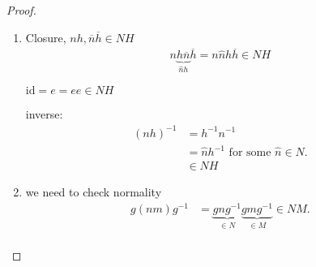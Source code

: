 \begin{proof} ~
  \begin{enumerate} \def\labelenumi{\roman{enumi}.}
  \item
    Closure, $nh, \overline{n} \overline{h} \in NH$
    \begin{align*}
      n \underbrace{h \overline{n}}_{\hat{n} h} \overline{h} = n \hat{n} h \overline{h} \in NH
    \end{align*}

    $\text{id} = e = ee \in NH$

    inverse:
    \begin{align*}
        (nh)^{-1} &= h^{-1} n^{-1} \\
        &= \hat{n} h^{-1} \text{ for some } \hat{n} \in N. \\
        &\in NH
    \end{align*}
  \item
    we need to check normality
    \begin{align*}
      g (nm) g^{-1} &= \underbrace{g n g^{-1}}_{\in N} \underbrace{g m g^{-1}}_{\in M} \in NM.\\
    \end{align*}
  \end{enumerate}
\end{proof}